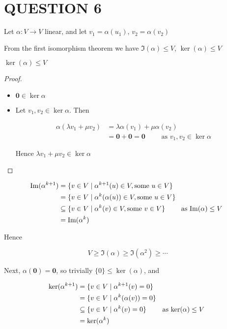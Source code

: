 \documentclass[a4paper]{article}
\begin{document}
	
	\section{QUESTION 6}
	
	
Let $ \alpha : V \to V $ linear, and let $ v_{1} = \alpha(u_{1}) $, $ v_{2} = \alpha(v_{2}) $

From the first isomorphism theorem we have $ \Im(\alpha) \leq V $,
$ \ker	(\alpha) \leq V $

\begin{prop} 
	$ \ker (\alpha) \leq V $
\end{prop}

\begin{proof}
	\begin{itemize}
		\item $ \mathbf{0} \in \ker \alpha $
		\item Let $ v_{1},v_{2} \in \ker \alpha $. Then
		
		\begin{align*}
		\alpha( \lambda v_{1} + \mu v_{2}) & = \lambda \alpha(v_{1}) + \mu \alpha (v_{2}) \\
		& = \mathbf{0} + \mathbf{0} = \mathbf{0} \qquad \text{ as } v_{1},v_{2} \in \ker \alpha
		\end{align*}
		
		Hence $ \lambda v_{1} + \mu v_{2} \in \ker \alpha $
	\end{itemize}
\end{proof}

\begin{align*}
\Im (\alpha^{k+1}) & = \{  v \in V \; | \; \alpha^{k+1}(u) \in V, \text{some } u \in V \} \\
& = \{  v \in V \; | \; \alpha^{k}(\alpha(u)) \in V, \text{some } u \in V \}\\
& \subseteq \{  v \in V \; | \; \alpha^{k}(v) \in V, \text{some } v \in V \}  \qquad \text{ as $ \Im(\alpha) \leq V $ } \\
& = \Im(\alpha^{k})
\end{align*}

Hence

\[ V \geq \Im (\alpha) \geq \Im (\alpha^{2}) \geq \cdots \]

Next, $ \alpha(\mathbf{0}) = \mathbf{0} $, so trivially $ \{ 0 \} \leq \ker(\alpha) $, and

\begin{align*}
\ker (\alpha^{k+1}) & = \{  v \in V \; | \; \alpha^{k+1}(v) =0\} \\
& = \{  v \in V \; | \; \alpha^{k}(\alpha(v)) =0 \}\\
& \subseteq \{  v \in V \; | \; \alpha^{k}(v) =0 \}  \qquad \text{ as $ \ker(\alpha) \leq V $ } \\
& = \ker(\alpha^{k})
\end{align*}
\end{document}
